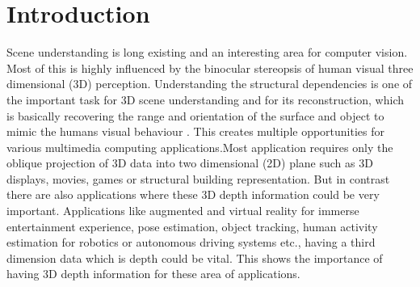 
\chapter{Introduction} %

\label{Chapter1:introduction} %


\newcommand{\keyword}[1]{\textbf{#1}}
\newcommand{\tabhead}[1]{\textbf{#1}}
\newcommand{\code}[1]{\texttt{#1}}
\newcommand{\file}[1]{\texttt{\bfseries#1}}
\newcommand{\option}[1]{\texttt{\itshape#1}}




Scene understanding is long existing and an interesting area for computer vision. Most of this is highly influenced by the binocular stereopsis of human visual three dimensional (3D) perception. Understanding the structural dependencies is one of the important task for 3D scene understanding and for its reconstruction, which is basically recovering the range and orientation of the surface and object to mimic the humans visual behaviour \cite{barnard1982computational}. This creates multiple opportunities for various multimedia computing applications.Most application requires only the oblique projection of 3D data into two dimensional (2D) plane such as 3D displays, movies, games or structural building representation. But in contrast there are also applications where these 3D depth information could be very important. Applications like augmented and virtual reality for immerse entertainment experience, pose estimation, object tracking, human activity estimation for robotics or autonomous driving systems etc., having a third dimension data which is depth could be vital. This shows the importance of having 3D depth information for these area of applications. \\

